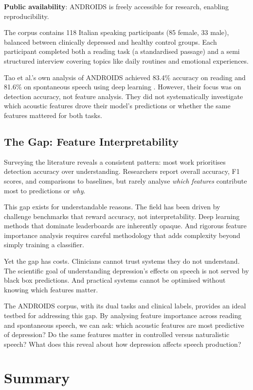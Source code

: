 \textbf{Public availability}: ANDROIDS is freely accessible for research, enabling reproducibility.

The corpus contains 118 Italian speaking participants (85 female, 33 male), balanced between clinically depressed and healthy control groups. Each participant completed both a reading task (a standardised passage) and a semi structured interview covering topics like daily routines and emotional experiences.

Tao et al.'s own analysis of ANDROIDS achieved 83.4\% accuracy on reading and 81.6\% on spontaneous speech using deep learning \cite{Tao2024}. However, their focus was on detection accuracy, not feature analysis. They did not systematically investigate which acoustic features drove their model's predictions or whether the same features mattered for both tasks.

\subsection{The Gap: Feature Interpretability}

Surveying the literature reveals a consistent pattern: most work prioritises detection accuracy over understanding. Researchers report overall accuracy, F1 scores, and comparisons to baselines, but rarely analyse \textit{which features} contribute most to predictions or \textit{why}.

This gap exists for understandable reasons. The field has been driven by challenge benchmarks that reward accuracy, not interpretability. Deep learning methods that dominate leaderboards are inherently opaque. And rigorous feature importance analysis requires careful methodology that adds complexity beyond simply training a classifier.

Yet the gap has costs. Clinicians cannot trust systems they do not understand. The scientific goal of understanding depression's effects on speech is not served by black box predictions. And practical systems cannot be optimised without knowing which features matter.

The ANDROIDS corpus, with its dual tasks and clinical labels, provides an ideal testbed for addressing this gap. By analysing feature importance across reading and spontaneous speech, we can ask: which acoustic features are most predictive of depression? Do the same features matter in controlled versus naturalistic speech? What does this reveal about how depression affects speech production?

\section{Summary}

